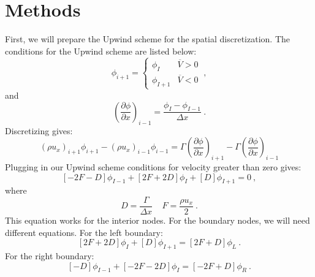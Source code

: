 \documentclass[12pt]{article}
\begin{document}
\section{Methods}
First, we will prepare the Upwind scheme for the spatial discretization. The conditions for the Upwind scheme are listed below:
\begin{equation*}
    \phi_{i+1} = \begin{cases}
                    \phi_{I} & \overline{V} > 0\\
                    \phi_{I+1} & \overline{V} < 0
                 \end{cases}\:,
\end{equation*}
and
\begin{equation}
    \left(\frac{\partial \phi}{\partial x}\right)_{i-1} = \frac{\phi_{I} - \phi_{I-1}}{\Delta x}\:.
\end{equation}
Discretizing gives:
\begin{equation*}
    \left( \rho u_x \right)_{i+1} \phi_{i+1} - \left( \rho u_x \right)_{i-1} \phi_{i-1} = \Gamma \left( \frac{\partial \phi}{\partial x} \right)_{i+1} - \Gamma \left( \frac{\partial \phi}{\partial x} \right)_{i-1}
\end{equation*}
Plugging in our Upwind scheme conditions for velocity greater than zero gives:
\begin{equation*}
    \left[-2F - D  \right] \phi_{I-1} + \left[ 2F + 2D \right] \phi_{I} + \left[ D \right] \phi_{I+1} = 0\:,
\end{equation*}
where
\begin{equation*}
    D = \frac{\Gamma}{\Delta x} ~~~~~ F = \frac{\rho u_x}{2}\:.
\end{equation*}
This equation works for the interior nodes. For the boundary nodes, we will need different equations. For the left boundary:
\begin{equation*}
    \left[ 2F + 2D \right] \phi_{I} + \left[ D \right] \phi_{I+1} = \left[ 2F + D \right] \phi_{L}\:.
\end{equation*}
For the right boundary:
\begin{equation*}
    \left[ -D \right] \phi_{I-1} + \left[ -2F - 2D \right] \phi_{I} = \left[ -2F + D \right] \phi_{R}\:.
\end{equation*}
\end{document}

